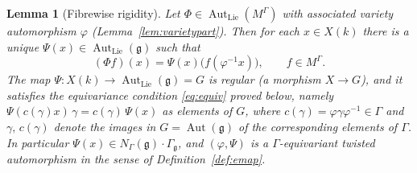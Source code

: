 \documentclass{amsart}
\newtheorem{lemma}{Lemma}
\theoremstyle{definition}
\DeclareMathOperator{\Aut}{Aut}
\newcommand{\g}{\mathfrak{g}}
\newcommand{\M}{M}
\begin{document}
\begin{lemma}[Fibrewise rigidity]\label{lem:fibrerigid}
Let $\Phi\in\Aut_{\mathrm{Lie}}(\M^\Gamma)$ with associated variety
automorphism $\varphi$ (Lemma~\ref{lem:varietypart}).  Then for each
$x\in X(k)$ there is a unique $\Psi(x)\in\Aut_{\mathrm{Lie}}(\g)$ such that
\begin{equation}\label{eq:fiber}
(\Phi f)(x)=\Psi(x)\bigl(f(\varphi^{-1}x)\bigr),\qquad f\in\M^\Gamma .
\end{equation}
The map $\Psi\colon X(k)\to\Aut_{\mathrm{Lie}}(\g)=G$ is regular (a
morphism $X\to G$), and it satisfies the equivariance condition
\textnormal{\eqref{eq:equiv}} proved below, namely
$\Psi(c(\gamma)x)\,\gamma=c(\gamma)\,\Psi(x)$ as elements of $G$, where
$c(\gamma)=\varphi\gamma\varphi^{-1}\in\Gamma$ and $\gamma,\,c(\gamma)$
denote the images in $G=\Aut(\g)$ of the corresponding elements of
$\Gamma$.  In particular $\Psi(x)\in N_\Gamma(\g)\cdot
\Gamma_\g$, and $(\varphi,\Psi)$ is a $\Gamma$-equivariant twisted
automorphism in the sense of Definition~\ref{def:emap}.
\end{lemma}
\end{document}
